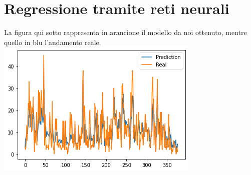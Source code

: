 \documentclass{article}
\begin{document}
\section{Regressione tramite reti neurali}
La figura qui sotto rappresenta in arancione il modello da noi ottenuto, 
mentre quello in blu l'andamento reale.
    \includegraphics[scale = 0.5]{Immagini/regressionePM25.PNG}
\end{document}
